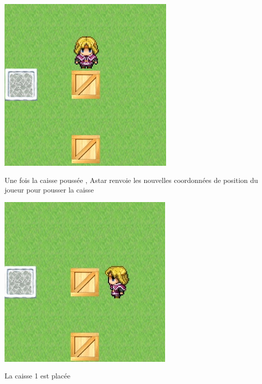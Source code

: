 \documentclass{article}
\begin{document}
		\begin{center}
		\vspace{1cm}
		\includegraphics[scale=0.8]{../Screenshots/astar3.jpg}
		
		Une fois la caisse poussée , Astar renvoie les nouvelles coordonnées de position du joueur pour pousser la caisse
		\end{center}
		\begin{center}
		\vspace{1cm}
		\includegraphics[scale=0.8]{../Screenshots/astar4.jpg}
		
		La caisse 1 est placée
		\end{center}
		
\end{document}
